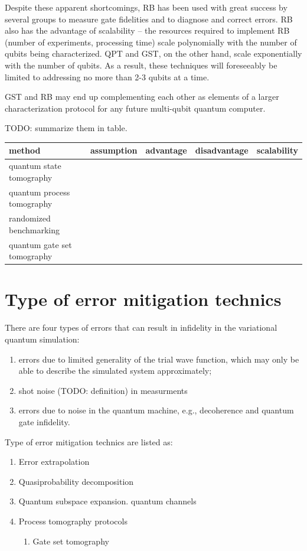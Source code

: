 \documentclass[11pt, oneside]{article}   	%
\begin{document}
Despite these apparent shortcomings, RB has been used with great success by several groups to measure gate fidelities and to diagnose and correct errors. 
RB also has the advantage of scalability -- the resources required to implement RB (number of experiments, processing time) scale polynomially with the number of qubits being characterized. 
QPT and GST, on the other hand, scale exponentially with the number of qubits. 
As a result, these techniques will foreseeably be limited to addressing no more than 2-3 qubits at a time. 

GST and RB may end up complementing each other as elements of a larger characterization protocol for any future multi-qubit quantum computer.

TODO: summarize them in table.
\begin{table}[h]
\begin{tabular}{l | l | l | l | l}
method & assumption & advantage & disadvantage & scalability \\
\hline
quantum state tomography &  &  &  &  \\
quantum process tomography &  &  &  &  \\
randomized benchmarking &  &  &  & \\
quantum gate set tomography &  &  &  & 
\end{tabular}
\end{table}

\section{Type of error mitigation technics}
There are four types of errors that can result in infidelity in the variational quantum simulation: 
\begin{enumerate}
\item errors due to limited generality of the trial wave function, which may only be able to describe the simulated system approximately; 
\item shot noise (TODO: definition) in measurments 
\item errors due to noise in the quantum machine, e.g., decoherence and quantum gate infidelity.
\end{enumerate}

Type of error mitigation technics are listed as:
\begin{enumerate}
\item Error extrapolation
\item Quasiprobability decomposition
\item Quantum subspace expansion. quantum channels
\item Process tomography protocols
\begin{enumerate}
\item Gate set tomography
\end{enumerate}
\end{enumerate}
\end{document}
